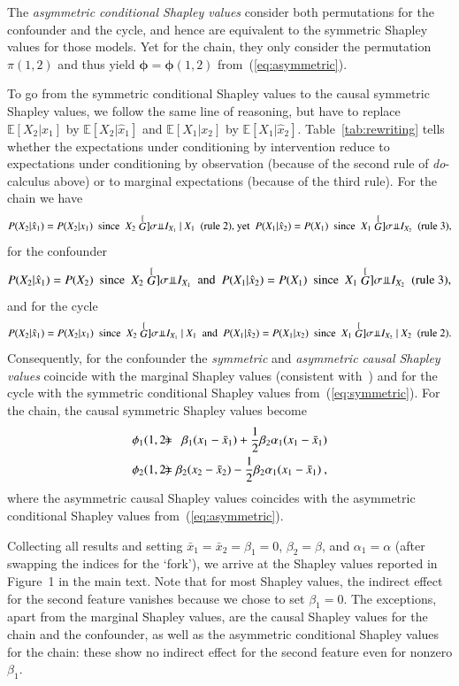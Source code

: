 \documentclass{article}
\newcommand{\expectation}{\mathbb{E}}
\newcommand{\sdo}[1]{\hat{x}_{#1}}
\newcommand{\perm}{\pi}
\newcommand{\bx}{\bar{x}}
\newcommand{\isequal}{\hspace*{-2.5mm} & = & \hspace*{-2.5mm}}
\begin{document}
The {\em asymmetric conditional Shapley values} consider both permutations for the confounder and the cycle, and hence are equivalent to the symmetric Shapley values for those models. Yet for the chain, they only consider the permutation $\perm(1,2)$ and thus yield $\bm{\phi} = \bm{\phi}(1,2)$ from~(\ref{eq:asymmetric}).

To go from the symmetric conditional Shapley values to the causal symmetric Shapley values, we follow the same line of reasoning, but have to replace $\expectation[X_2|x_1]$ by $\expectation[X_2|\sdo{1}]$ and $\expectation[X_1|x_2]$ by $\expectation[X_1|\sdo{2}]$. Table~\ref{tab:rewriting} tells whether
the expectations under conditioning by intervention reduce to expectations under conditioning by observation (because of the second rule of \textit{do}-calculus above) or to marginal expectations (because of the third rule). For the chain we have
\[
P(X_2 | \sdo{1}) = P(X_2 | x_1) \mbox{~~since~~} X_2 \perpsg I_{X_1} ~|~ X_1 \mbox{~~(rule 2),~yet~~} P(X_1 | \sdo{2}) = P(X_1) \mbox{~~since~~} X_1 \perpsg I_{X_2} \mbox{~~(rule 3),}
\]
for the confounder
\[
P(X_2 | \sdo{1}) = P(X_2) \mbox{~~since~~} X_2 \perpsg I_{X_1}  \mbox{~~and~~} P(X_1 | \sdo{2}) = P(X_1) \mbox{~~since~~} X_1 \perpsg I_{X_2} \mbox{~~(rule 3),}
\]
and for the cycle
\[
P(X_2 | \sdo{1}) = P(X_2 | x_1) \mbox{~~since~~} X_2 \perpsg I_{X_1} ~|~ X_1 \mbox{~~and~~} P(X_1 | \sdo{2}) = P(X_1|x_2) \mbox{~~since~~} X_1 \perpsg I_{X_2} ~|~ X_2 \mbox{~~(rule 2).}
\]
Consequently, for the confounder the {\em symmetric} and {\em asymmetric causal Shapley values} coincide with the marginal Shapley values (consistent with~\cite{janzing2019feature}) and for the cycle with the symmetric conditional Shapley values from~(\ref{eq:symmetric}). For the chain, the causal symmetric Shapley values become
\begin{eqnarray}
\phi_1(1,2) \isequal \beta_1 (x_1 - \bx_1) + {1 \over 2} \beta_2 \alpha_1 (x_1 - \bx_1) \nonumber \\
\phi_2(1,2) \isequal \beta_2 (x_2 -\bx_2) - {1 \over 2} \beta_2 \alpha_1 (x_1 - \bx_1) \: ,
\label{eq:asymmetric}
\end{eqnarray}
where the asymmetric causal Shapley values coincides with the asymmetric conditional Shapley values from~(\ref{eq:asymmetric}).

Collecting all results and setting $\bx_1 = \bx_2 = \beta_1 = 0$, $\beta_2 = \beta$, and $\alpha_1 = \alpha$ (after swapping the indices for the `fork'), we arrive at the Shapley values reported in Figure~1 in the main text. Note that for most Shapley values, the indirect effect for the second feature vanishes because we chose to set $\beta_1 = 0$. The exceptions, apart from the marginal Shapley values, are the causal Shapley values for the chain and the confounder, as well as the asymmetric conditional Shapley values for the chain: these show no indirect effect for the second feature even for nonzero $\beta_1$.
\end{document}

